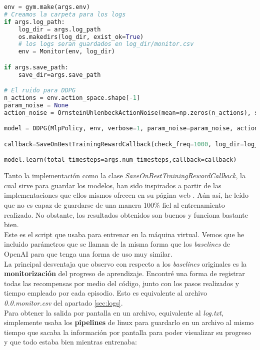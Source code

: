 \documentclass[11pt,fleqn]{book} %
\begin{document}
\begin{lstlisting}[language=python]
env = gym.make(args.env)
# Creamos la carpeta para los logs
if args.log_path:
	log_dir = args.log_path
	os.makedirs(log_dir, exist_ok=True)
	# los logs seran guardados en log_dir/monitor.csv
	env = Monitor(env, log_dir)

if args.save_path:
	save_dir=args.save_path

# El ruido para DDPG
n_actions = env.action_space.shape[-1]
param_noise = None
action_noise = OrnsteinUhlenbeckActionNoise(mean=np.zeros(n_actions), sigma=float(0.5) * np.ones(n_actions))

model = DDPG(MlpPolicy, env, verbose=1, param_noise=param_noise, action_noise=action_noise,seed=args.seed)

callback=SaveOnBestTrainingRewardCallback(check_freq=1000, log_dir=log_dir, save_dir=save_dir)

model.learn(total_timesteps=args.num_timesteps,callback=callback)
\end{lstlisting}
 
 
Tanto la implementación como la clase \textit{SaveOnBestTrainingRewardCallback}, la cual sirve para guardar los modelos, han sido inspirados a partir de las implementaciones que ellos mismos ofrecen en su página web \cite{article:codigoDDPG} \cite{article:stableDDPG}. Aún así, he leído que no es capaz de guardarse de una manera 100\% fiel al entrenamiento realizado. No obstante, los resultados obtenidos son buenos y funciona bastante bien. \\

Este es el script que usaba para entrenar en la máquina virtual. Vemos que he incluido parámetros que se llaman de la misma forma que los \textit{baselines} de OpenAI para que tenga una forma de uso muy similar. \\

La principal desventaja que observo con respecto a los \textit{baselines} originales es la \textbf{monitorización} del progreso de aprendizaje. Encontré una forma de registrar todas las recompensas por medio del código, junto con los pasos realizados y tiempo empleado por cada episodio. Esto es equivalente al archivo \textit{0.0.monitor.csv} del apartado \ref{sec:logs}. \\

Para obtener la salida por pantalla en un archivo, equivalente al \textit{log.txt}, simplemente usaba los \textbf{pipelines} de linux para guardarlo en un archivo al mismo tiempo que sacaba la información por pantalla para poder visualizar su progreso y que todo estaba bien mientras entrenaba:
\end{document}
